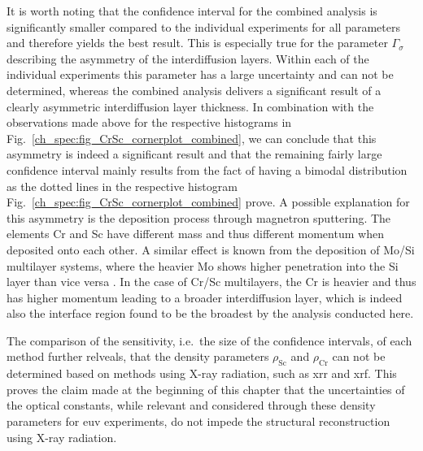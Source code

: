 It is worth noting that the confidence interval for the combined analysis is 
significantly smaller compared to the individual experiments for all parameters and therefore yields the best result. This is especially true for the parameter $\Gamma_\sigma$ describing the asymmetry of the interdiffusion layers. Within each of the individual experiments this parameter has a large uncertainty and can not be determined, whereas the combined analysis delivers a significant result of a clearly asymmetric interdiffusion layer thickness. In combination with the observations made above for the respective histograms in Fig.~\ref{ch_spec:fig_CrSc_cornerplot_combined}, we can conclude that this asymmetry is indeed a significant result and that the remaining fairly large confidence interval mainly results from the fact of having a bimodal distribution as the dotted lines in the respective histogram Fig.~\ref{ch_spec:fig_CrSc_cornerplot_combined} prove. A possible explanation for this asymmetry is the deposition process through magnetron sputtering. The elements Cr and Sc have different mass and thus different momentum when deposited onto each other. A similar effect is known from the deposition of Mo/Si multilayer systems, where the heavier Mo shows higher penetration into the Si layer than vice versa \cite{petford-long_highresolution_1987}. In the case of Cr/Sc multilayers, the Cr is heavier and thus has higher momentum leading to a broader interdiffusion layer, which is indeed also the interface region found to be the broadest by the analysis conducted here.

The comparison of the sensitivity, i.e.~the size of the confidence intervals, of each method further relveals, that the density parameters $\rho_\text{Sc}$ and $\rho_\text{Cr}$ can not be determined based on methods using X-ray radiation, such as \gls{xrr} and \gls{xrf}. This proves the claim made at the beginning of this chapter that the uncertainties of the optical constants, while relevant and considered through these density parameters for \gls{euv} experiments, do not impede the structural reconstruction using X-ray radiation.

